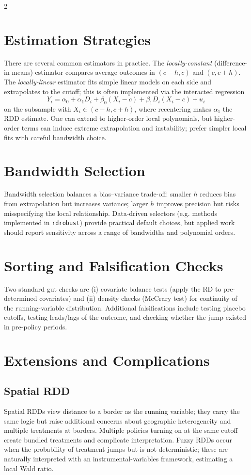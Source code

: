 \documentclass[12pt]{article}
\begin{document}
\begin{multicols}{2}
\section*{Estimation Strategies}
There are several common estimators in practice.
The \emph{locally-constant} (difference-in-means) estimator compares average outcomes in $(c-h, c)$ and $(c, c+h)$.
The \emph{locally-linear} estimator fits simple linear models on each side and extrapolates to the cutoff; this is often implemented via the interacted regression
$$
Y_i = \alpha_0 + \alpha_1 D_i + \beta_0 (X_i - c) + \beta_1 D_i (X_i - c) + u_i
$$
on the subsample with $X_i \in (c-h, c+h)$, where recentering makes $\alpha_1$ the RDD estimate.
One can extend to higher-order local polynomials, but higher-order terms can induce extreme extrapolation and instability; prefer simpler local fits with careful bandwidth choice.

\section*{Bandwidth Selection}
Bandwidth selection balances a bias–variance trade-off: smaller $h$ reduces bias from extrapolation but increases variance; larger $h$ improves precision but risks misspecifying the local relationship.
Data-driven selectors (e.g. methods implemented in \texttt{rdrobust}) provide practical default choices, but applied work should report sensitivity across a range of bandwidths and polynomial orders.

\section*{Sorting and Falsification Checks}
Two standard gut checks are (i) covariate balance tests (apply the RD to pre-determined covariates) and (ii) density checks (McCrary test) for continuity of the running-variable distribution.
Additional falsifications include testing placebo cutoffs, testing leads/lags of the outcome, and checking whether the jump existed in pre-policy periods.

\section*{Extensions and Complications}

\subsection*{Spatial RDD}
Spatial RDDs view distance to a border as the running variable; they carry the same logic but raise additional concerns about geographic heterogeneity and multiple treatments at borders.
Multiple policies turning on at the same cutoff create bundled treatments and complicate interpretation.
Fuzzy RDDs occur when the probability of treatment jumps but is not deterministic; these are naturally interpreted with an instrumental-variables framework, estimating a local Wald ratio.


\end{multicols}
\end{document}
